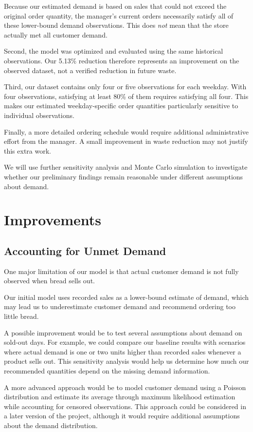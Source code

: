 \documentclass[11pt]{article}
\begin{document}
Because our estimated demand is based on sales that could not exceed the original order quantity, the manager's current orders necessarily satisfy all of these lower-bound demand observations. This does \emph{not} mean that the store actually met all customer demand.

Second, the model was optimized and evaluated using the same historical observations. Our 5.13\% reduction therefore represents an improvement on the observed dataset, not a verified reduction in future waste.

Third, our dataset contains only four or five observations for each weekday. With four observations, satisfying at least 80\% of them requires satisfying all four. This makes our estimated weekday-specific order quantities particularly sensitive to individual observations.

Finally, a more detailed ordering schedule would require additional administrative effort from the manager. A small improvement in waste reduction may not justify this extra work.

We will use further sensitivity analysis and Monte Carlo simulation to investigate whether our preliminary findings remain reasonable under different assumptions about demand.

\section{Improvements}

\subsection{Accounting for Unmet Demand}

One major limitation of our model is that actual customer demand is not fully observed when bread sells out.

Our initial model uses recorded sales as a lower-bound estimate of demand, which may lead us to underestimate customer demand and recommend ordering too little bread.

A possible improvement would be to test several assumptions about demand on sold-out days. For example, we could compare our baseline results with scenarios where actual demand is one or two units higher than recorded sales whenever a product sells out. This sensitivity analysis would help us determine how much our recommended quantities depend on the missing demand information.

A more advanced approach would be to model customer demand using a Poisson distribution and estimate its average through maximum likelihood estimation while accounting for censored observations. This approach could be considered in a later version of the project, although it would require additional assumptions about the demand distribution.
\end{document}
